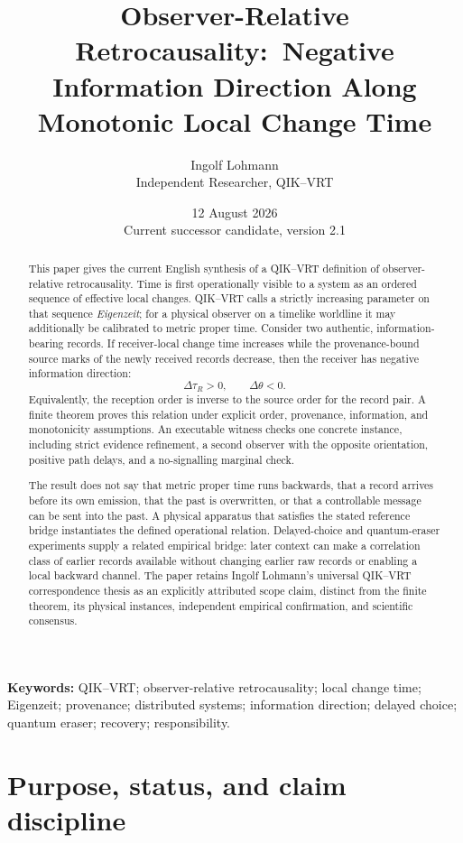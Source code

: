 \documentclass[11pt]{article}
\title{Observer-Relative Retrocausality:\
\large Negative Information Direction Along Monotonic Local Change Time}
\author{Ingolf Lohmann\\
Independent Researcher, QIK--VRT}
\date{12 August 2026\\Current successor candidate, version 2.1}
\theoremstyle{remark}
\begin{document}
\maketitle

\begin{abstract}
This paper gives the current English synthesis of a QIK--VRT definition of
observer-relative retrocausality.  Time is first operationally visible to a
system as an ordered sequence of effective local changes.  QIK--VRT calls a
strictly increasing parameter on that sequence \emph{Eigenzeit}; for a
physical observer on a timelike worldline it may additionally be calibrated
to metric proper time.  Consider two authentic, information-bearing records.
If receiver-local change time increases while the provenance-bound source
marks of the newly received records decrease, then the receiver has negative
information direction:
\[
  \Delta\tau_R>0,\qquad \Delta\theta<0.
\]
Equivalently, the reception order is inverse to the source order for the
record pair.  A finite theorem proves this relation under explicit order,
provenance, information, and monotonicity assumptions.  An executable witness
checks one concrete instance, including strict evidence refinement, a second
observer with the opposite orientation, positive path delays, and a
no-signalling marginal check.

The result does not say that metric proper time runs backwards, that a record
arrives before its own emission, that the past is overwritten, or that a
controllable message can be sent into the past.  A physical apparatus that
satisfies the stated reference bridge instantiates the defined operational
relation.  Delayed-choice and quantum-eraser experiments supply a related
empirical bridge: later context can make a correlation class of earlier
records available without changing earlier raw records or enabling a local
backward channel.  The paper retains Ingolf Lohmann's universal QIK--VRT
correspondence thesis as an explicitly attributed scope claim, distinct from
the finite theorem, its physical instances, independent empirical
confirmation, and scientific consensus.
\end{abstract}

\noindent\textbf{Keywords:} QIK--VRT; observer-relative retrocausality;
local change time; Eigenzeit; provenance; distributed systems; information
direction; delayed choice; quantum eraser; recovery; responsibility.

\section{Purpose, status, and claim discipline}
\label{sec:purpose}
\end{document}
